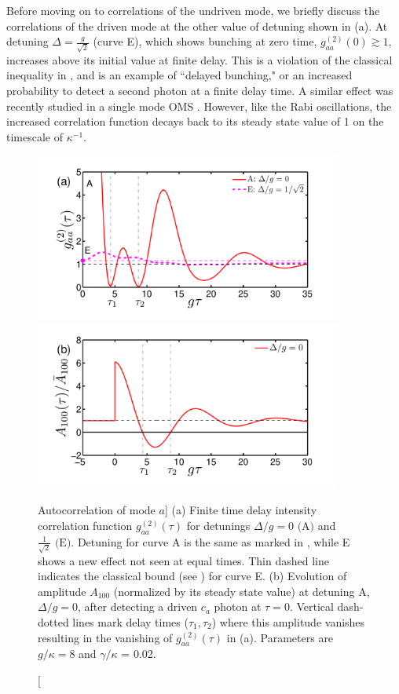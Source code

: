 Before moving on to correlations of the undriven mode,
we briefly discuss the correlations of the driven mode at the
 other value of  detuning shown in 
(a).
 At detuning
$\Delta = \frac{g}{\sqrt{2}}$ (curve E),
which shows bunching at zero time,
$g^{(2)}_{aa}(0) \gtrsim 1$, 
increases  above its initial value at
finite delay.
This is a violation of the classical inequality in
, 
and is an example of ``delayed bunching,"
or an increased probability to detect a second
photon at a finite delay time.
A similar effect was recently studied
in a single mode OMS \cite{Kronwald2012}.
However, like the Rabi oscillations,
the increased correlation function decays back to its steady state
value of 1 on
the timescale of $\kappa^{-1}$.
\begin{figure} 
\centering
  \includegraphics[width=0.9\textwidth]{./figs_Komar2013/fig5a.pdf}\\[-0.5cm]
  \includegraphics[width=0.9\textwidth]{./figs_Komar2013/fig5b.pdf}
  \caption
  [Autocorrelation of mode $a$]
  {
  \label{fig:g2aatau}
  (a) Finite time delay intensity
  correlation function $g^{(2)}_{aa}(\tau)$  for detunings
  $\Delta/g = 0 \text{ (A)}$ and $\frac{1}{\sqrt{2}}
  \text{ (E)}$.
  Detuning for curve A is the same as marked in ,
  while E shows a new effect not seen at equal times.
  Thin dashed line indicates the classical bound 
  (see ) for curve E. 
  (b) Evolution of amplitude $A_{100}$ (normalized by its
  steady state value)
  at detuning A, $\Delta/g = 0$,
  after detecting a driven $c_a$ photon at $\tau = 0$. 
  Vertical dash-dotted lines mark delay times ($\tau_1, \tau_2$) where this amplitude
  vanishes resulting in the vanishing of $g^{(2)}_{aa}(\tau)$
  in (a).
  Parameters are $g/\kappa = 8$ and $\gamma/\kappa$ = 0.02. 
  } 
\end{figure}
